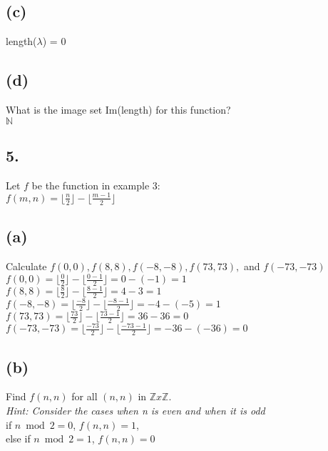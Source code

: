 \documentclass[11pt]{article}
\begin{document}
\subsection*{(c)}
\begin{center}
length($\lambda$) = 0
\end{center}

\subsection*{(d)}
\begin{center}
What is the image set Im(length) for this function?\\
\hfill \break
$\mathbb{N}$
\end{center}
%
%
\subsection*{5.}
\begin{center}
Let $f$ be the function in example 3:\\
$f(m,n) = \lfloor\frac{n}{2}\rfloor - \lfloor\frac{m-1}{2}\rfloor$
\end{center}

\subsection*{(a)}
\begin{center}
Calculate $f(0,0), f(8,8), f(-8,-8), f(73,73),$ and $f(-73,-73)$\\
\hfill \break
$f(0,0) = \lfloor\frac{0}{2}\rfloor - \lfloor\frac{0-1}{2}\rfloor = 0 - (-1) = 1$\\
$f(8,8) = \lfloor\frac{8}{2}\rfloor - \lfloor\frac{8-1}{2}\rfloor = 4 - 3 = 1$\\
$f(-8,-8) = \lfloor\frac{-8}{2}\rfloor - \lfloor\frac{-8-1}{2}\rfloor = -4 - (-5) = 1$\\
$f(73,73) = \lfloor\frac{73}{2}\rfloor - \lfloor\frac{73-1}{2}\rfloor = 36 - 36 = 0$\\
$f(-73,-73) = \lfloor\frac{-73}{2}\rfloor - \lfloor\frac{-73-1}{2}\rfloor = -36 - (-36) = 0$\\
\end{center}

\subsection*{(b)}
\begin{center}
Find $f(n,n)$ for all $(n,n)$ in $\mathbb{Z} x \mathbb{Z}$.\\
\textit{Hint: Consider the cases when n is even and when it is odd}\\
\hfill \break
if $n \bmod 2 = 0$, $f(n,n) = 1$,\\
else if $n \bmod 2 = 1$, $f(n,n) = 0$
\end{center}
%
%
\end{document}
